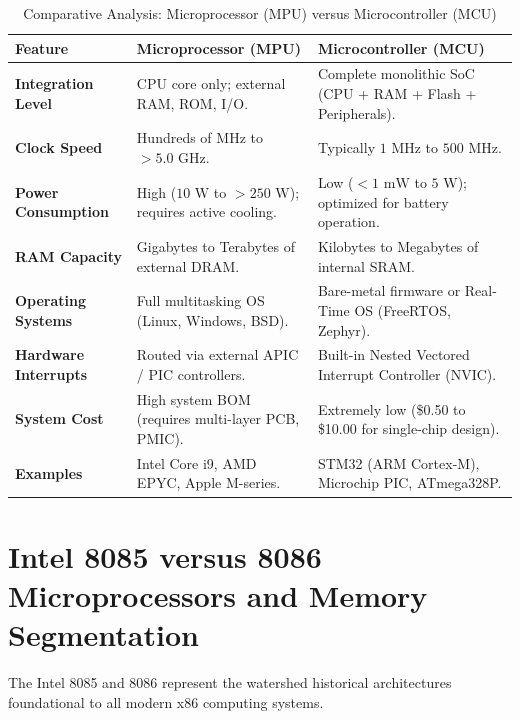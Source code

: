 \begin{table}[htbp]
\centering
\small
\caption{Comparative Analysis: Microprocessor (MPU) versus Microcontroller (MCU)}
\label{tab:mpu_vs_mcu}
\begin{tabularx}{\textwidth}{l X X}
\toprule
\textbf{Feature} & \textbf{Microprocessor (MPU)} & \textbf{Microcontroller (MCU)} \\
\midrule
\textbf{Integration Level} & CPU core only; external RAM, ROM, I/O. & Complete monolithic SoC (CPU + RAM + Flash + Peripherals). \\
\textbf{Clock Speed} & Hundreds of MHz to $>5.0\text{ GHz}$. & Typically $1\text{ MHz}$ to $500\text{ MHz}$. \\
\textbf{Power Consumption} & High ($10\text{ W}$ to $>250\text{ W}$); requires active cooling. & Low ($<1\text{ mW}$ to $5\text{ W}$); optimized for battery operation. \\
\textbf{RAM Capacity} & Gigabytes to Terabytes of external DRAM. & Kilobytes to Megabytes of internal SRAM. \\
\textbf{Operating Systems} & Full multitasking OS (Linux, Windows, BSD). & Bare-metal firmware or Real-Time OS (FreeRTOS, Zephyr). \\
\textbf{Hardware Interrupts} & Routed via external APIC / PIC controllers. & Built-in Nested Vectored Interrupt Controller (NVIC). \\
\textbf{System Cost} & High system BOM (requires multi-layer PCB, PMIC). & Extremely low (\$0.50 to \$10.00 for single-chip design). \\
\textbf{Examples} & Intel Core i9, AMD EPYC, Apple M-series. & STM32 (ARM Cortex-M), Microchip PIC, ATmega328P. \\
\bottomrule
\end{tabularx}
\end{table}


\section{Intel 8085 versus 8086 Microprocessors and Memory Segmentation}
\label{sec:8085_vs_8086}

The Intel 8085 and 8086 represent the watershed historical architectures foundational to all modern x86 computing systems.

